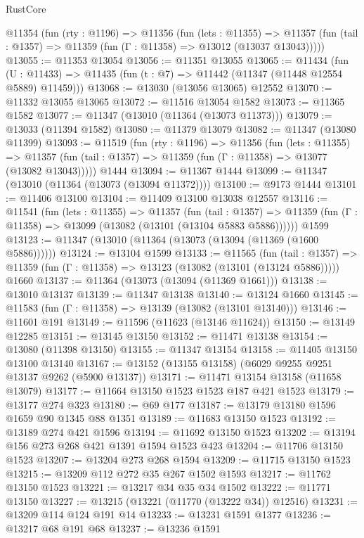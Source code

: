 \begin{lexlean}{RustCore}
\begin{coremodule}
  @11354
    (fun (rty : @1196) =>
    @11356
      (fun (lets : @11355) =>
      @11357 (fun (tail : @1357) => @11359 (fun (Γ : @11358) => @13012 (@13037 @13043)))))
@13055 := @11353 @13054
@13056 := @11351 @13055
@13065 := @11434
    (fun (U : @11433) => @11435 (fun (t : @7) => @11442 (@11347 (@11448 @12554 @5889) @11459)))
@13068 := @13030 (@13056 @13065) @12552
@13070 := @11332 @13055 @13065
@13072 := @11516 @13054 @1582
@13073 := @11365 @1582
@13077 := @11347 (@13010 (@11364 (@13073 @11373)))
@13079 := @13033 (@11394 @1582)
@13080 := @11379 @13079
@13082 := @11347 (@13080 @11399)
@13093 := @11519
    (fun (rty : @1196) =>
    @11356
      (fun (lets : @11355) =>
      @11357 (fun (tail : @1357) => @11359 (fun (Γ : @11358) => @13077 (@13082 @13043)))))
    @1444
@13094 := @11367 @1444
@13099 := @11347 (@13010 (@11364 (@13073 (@13094 @11372))))
@13100 := @9173 @1444
@13101 := @11406 @13100
@13104 := @11409 @13100 @13038 @12557
@13116 := @11541
    (fun (lets : @11355) =>
    @11357
      (fun (tail : @1357) =>
      @11359 (fun (Γ : @11358) => @13099 (@13082 (@13101 (@13104 @5883 @5886))))))
    @1599
@13123 := @11347 (@13010 (@11364 (@13073 (@13094 (@11369 (@1600 @5886))))))
@13124 := @13104 @1599
@13133 := @11565
    (fun (tail : @1357) => @11359 (fun (Γ : @11358) => @13123 (@13082 (@13101 (@13124 @5886)))))
    @1660
@13137 := @11364 (@13073 (@13094 (@11369 @1661)))
@13138 := @13010 @13137
@13139 := @11347 @13138
@13140 := @13124 @1660
@13145 := @11583 (fun (Γ : @11358) => @13139 (@13082 (@13101 @13140)))
@13146 := @11601 @191
@13149 := @11596 (@11623 (@13146 @11624))
@13150 := @13149 @12285
@13151 := @13145 @13150
@13152 := @11471 @13138
@13154 := @13080 (@11398 @13150)
@13155 := @11347 @13154
@13158 := @11405 @13150 @13100 @13140
@13167 := @13152 (@13155 @13158) (@6029 @9255 @9251 @13137 @9262 (@5900 @13137))
@13171 := @11471 @13154 @13158 (@11658 @13079)
@13177 := @11664 @13150 @1523 @1523 @187 @421 @1523
@13179 := @13177 @274 @323
@13180 := @69 @177
@13187 := @13179 @13180 @1596 @1659 @90 @1345 @88 @1351
@13189 := @11683 @13150 @1523
@13192 := @13189 @274 @421 @1596
@13194 := @11692 @13150 @1523
@13202 := @13194 @156 @273 @268 @421 @1391 @1594 @1523 @423
@13204 := @11706 @13150 @1523
@13207 := @13204 @273 @268 @1594
@13209 := @11715 @13150 @1523
@13215 := @13209 @112 @272 @35 @267 @1502 @1593
@13217 := @11762 @13150 @1523
@13221 := @13217 @34 @35 @34 @1502
@13222 := @11771 @13150
@13227 := @13215 (@13221 (@11770 (@13222 @34)) @12516)
@13231 := @13209 @114 @124 @191 @14
@13233 := @13231 @1591 @1377
@13236 := @13217 @68 @191 @68
@13237 := @13236 @1591

\end{coremodule}
\end{lexlean}
